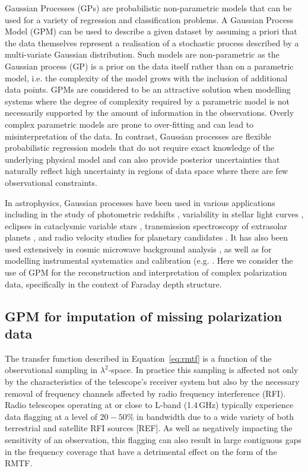 \documentclass[fleqn,usenatbib]{mnras}
\begin{document}
Gaussian Processes (GPs) are probabilistic non-parametric models that can be used for a variety of regression and classification problems. A Gaussian Process Model (GPM) can be used to describe a given dataset by assuming a priori that the data themselves represent a realisation of a stochastic process described by a multi-variate Gaussian distribution. Such models are non-parametric as the Gaussian process (GP) is a prior on the data itself rather than on a parametric model, i.e. the complexity of the model grows with the inclusion of additional data points. GPMs are considered to be an attractive solution when modelling systems where the degree of complexity required by a parametric model is not necessarily supported by the amount of information in the observations. Overly complex parametric models are prone to over-fitting and can lead to misinterpretation of the data. In contrast, Gaussian processes are flexible probabilistic regression models that do not require exact knowledge of the underlying physical model and can also provide posterior uncertainties that naturally reflect high uncertainty in regions of data space where there are few observational constraints.

In astrophysics, Gaussian processes have been used in various applications including in the study of photometric redshifts \citep{wa06300n}, variability in stellar light curves \citep{2018MNRAS.474.2094A}, eclipses in cataclysmic variable stars \citep{10.1093/mnras/stw2417}, transmission spectroscopy of extrasolar planets \citep{2012MNRAS.419.2683G}, and radio velocity studies for planetary candidates \citep{10.1093/mnras/stv1428}. It has also been used extensively in cosmic microwave background analysis \citep{1987MNRAS.226..655B, 1999CoScE...1...21B, PhysRevD.67.023001}, as well as for modelling instrumental systematics and calibration (e.g. \cite{2012MNRAS.419.2683G, 2014MNRAS.443.2517H, 2015ApJ...800...46B, Czekala_2015, 2015MNRAS.451..680E, 10.1093/mnras/stv1428, 2015Natur.526..546V, 2016MNRAS.459.2408A, 2016MNRAS.456L...6R, 2017MNRAS.466.4250L}. Here we consider the use of GPM for the reconstruction and interpretation of complex polarization data, specifically in the context of Faraday depth structure. 

\subsection{GPM for imputation of missing polarization data}
\label{sec:imputation}

The transfer function described in Equation~\ref{eq:rmtf} is a function of the observational sampling in $\lambda^2$-space. In practice this sampling is affected not only by the characteristics of the telescope's receiver system but also by the necessary removal of frequency channels affected by radio frequency interference (RFI). Radio telescopes operating at or close to L-band (1.4\,GHz) typically experience data flagging at a level of $20-50\%$ in bandwidth due to a wide variety of both terrestrial and satellite RFI sources [REF]. As well as negatively impacting the sensitivity of an observation, this flagging can also result in large contiguous gaps in the frequency coverage that have a detrimental effect on the form of the RMTF.
\end{document}
